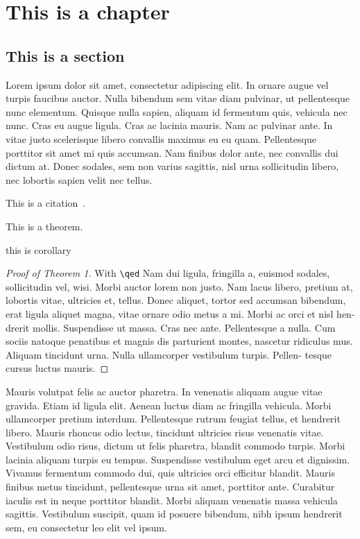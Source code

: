 \chapter{This is a chapter}

\section{This is a section}

Lorem ipsum dolor sit amet, consectetur adipiscing elit. In ornare augue vel turpis faucibus auctor. Nulla bibendum sem vitae diam pulvinar, ut pellentesque nunc elementum. Quisque nulla sapien, aliquam id fermentum quis, vehicula nec nunc. Cras eu augue ligula. Cras ac lacinia mauris. Nam ac pulvinar ante. In vitae justo scelerisque libero convallis maximus eu eu quam. Pellentesque porttitor sit amet mi quis accumsan. Nam finibus dolor ante, nec convallis dui dictum at. Donec sodales, sem non varius sagittis, nisl urna sollicitudin libero, nec lobortis sapien velit nec tellus.

\begin{remark}
    This is a citation~\cite{conway2012functions}.
\end{remark}

\begin{theorem}
    This is a theorem.
\end{theorem}

\begin{dang}
\begin{corollary}
    this is corollary
\end{corollary}
\end{dang}

\begin{proof}[Proof of Theorem 1]
With \verb|\qed| Nam dui ligula, fringilla a, euismod sodales, sollicitudin
vel, wisi. Morbi auctor lorem non justo. Nam lacus libero, pretium at, lobortis
vitae, ultricies et, tellus. Donec aliquet, tortor sed accumsan bibendum, erat
ligula aliquet magna, vitae ornare odio metus a mi. Morbi ac orci et nisl hen-
drerit mollis. Suspendisse ut massa. Cras nec ante. Pellentesque a nulla. Cum
sociis natoque penatibus et magnis dis parturient montes, nascetur ridiculus
mus. Aliquam tincidunt urna. Nulla ullamcorper vestibulum turpis. Pellen-
tesque cursus luctus mauris.
\end{proof}



Mauris volutpat felis ac auctor pharetra. In venenatis aliquam augue vitae gravida. Etiam id ligula elit. Aenean luctus diam ac fringilla vehicula. Morbi ullamcorper pretium interdum. Pellentesque rutrum feugiat tellus, et hendrerit libero. Mauris rhoncus odio lectus, tincidunt ultricies risus venenatis vitae. Vestibulum odio risus, dictum ut felis pharetra, blandit commodo turpis. Morbi lacinia aliquam turpis eu tempus. Suspendisse vestibulum eget arcu et dignissim. Vivamus fermentum commodo dui, quis ultricies orci efficitur blandit. Mauris finibus metus tincidunt, pellentesque urna sit amet, porttitor ante. Curabitur iaculis est in neque porttitor blandit. Morbi aliquam venenatis massa vehicula sagittis. Vestibulum suscipit, quam id posuere bibendum, nibh ipsum hendrerit sem, eu consectetur leo elit vel ipsum. 

